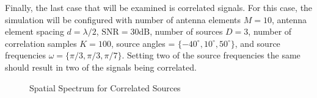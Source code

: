 \documentclass[conference]{IEEEtran}
\begin{document}
		Finally, the last case that will be examined is correlated signals. For this case, the simulation will be configured with number of antenna elements $M=10$, antenna element spacing $d = \lambda/2$, $\text{SNR}=30\text{dB}$, number of sources $D=3$, number of correlation samples $K=100$, source angles = $\{-40^{\circ}, 10^{\circ}, 50^{\circ}\}$, and source frequencies $\omega = \{\pi/3, \pi/3, \pi/7\}$. Setting two of the source frequencies the same should result in two of the signals being correlated. 
		
		\begin{figure}[H]
			\centerline{}
			\caption{Spatial Spectrum for Correlated Sources}
			\label{fig::correlated_signals}
		\end{figure}
		
\end{document}
